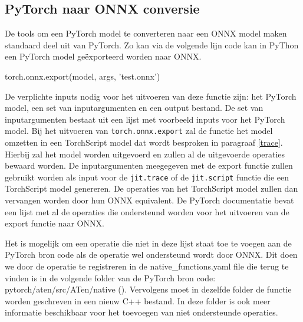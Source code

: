 \subsection{PyTorch naar ONNX conversie}
De tools om een PyTorch model te converteren naar een ONNX model maken standaard deel uit van PyTorch.
Zo kan via de volgende lijn code kan in PyThon een PyTorch model ge\"exporteerd worden naar ONNX.

\begin{python}
torch.onnx.export(model, args, 'test.onnx')
\end{python}

De verplichte inputs nodig voor het uitvoeren van deze functie zijn: het PyTorch model, een set van inputargumenten en een output bestand.
De set van inputargumenten bestaat uit een lijst met voorbeeld inputs voor het PyTorch model.
Bij het uitvoeren van \texttt{torch.onnx.export} zal de functie het model omzetten in een TorchScript model dat wordt besproken in paragraaf \ref{trace}.
Hierbij zal het model worden uitgevoerd en zullen al de uitgevoerde operaties bewaard worden.
De inputargumenten meegegeven met de export functie zullen gebruikt worden als input voor de \texttt{jit.trace} of de \texttt{jit.script} functie die een TorchScript model genereren.
De operaties van het TorchScript model zullen dan vervangen worden door hun ONNX equivalent.
De PyTorch documentatie bevat een lijst met al de operaties die ondersteund worden voor het uitvoeren van de export functie naar ONNX.

Het is mogelijk om een operatie die niet in deze lijst staat toe te voegen aan de PyTorch bron code als de operatie wel ondersteund wordt door ONNX.
Dit doen we door de operatie te registreren in de native\_functions.yaml file die terug te vinden is in de volgende folder van de PyTorch bron code: pytorch/aten/src/ATen/native (\cite{pytorch_atensrcatennative_2021}).
Vervolgens moet in dezelfde folder de functie worden geschreven in een nieuw C++ bestand.
In deze folder is ook meer informatie beschikbaar voor het toevoegen van niet ondersteunde operaties.

